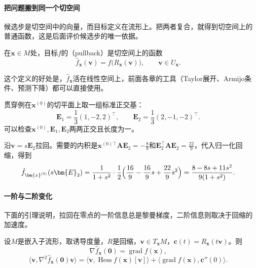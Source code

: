 \paragraph{把问题搬到同一个切空间}
候选步是切空间中的向量，而目标定义在流形上。把两者复合，就得到切空间上的普通函数，这是后面评价候选步的唯一依据。

\begin{definition}[拉回目标]
 \label{def:mfo-pullback}
 在$\bm{x}\in M$处，目标$f$的（pullback）是切空间上的函数
 \begin{equation}
  \hat{f}_{\bm{x}}(\bm{v})=f\bigl(R_{\bm{x}}(\bm{v})\bigr),\qquad\bm{v}\in U_{\bm{x}}.
  \label{eq:mfo-pullback}
 \end{equation}
\end{definition}

这个定义的好处是，$\hat{f}_{\bm{x}}$活在线性空间上，前面各章的工具（Taylor展开、Armijo条件、预测下降）都可以直接使用。

贯穿例在$\bm{x}^{(0)}$的切平面上取一组标准正交基：
\[
 \bm{E}_1=\frac13(1,-2,2)^\top,\qquad
 \bm{E}_2=\frac13(2,-1,-2)^\top.
\]
可以检查$\bm{x}^{(0)},\bm{E}_1,\bm{E}_2$两两正交且长度为一。

沿$\bm{v}=s\bm{E}_2$拉回。需要的内积是$\bm{x}^{(0)\top}\bm{A}\bm{E}_2=-\tfrac89$和$\bm{E}_2^\top\bm{A}\bm{E}_2=\tfrac{22}{9}$，代入归一化回缩，得到
\begin{equation}
 \hat{f}_{\bm{x}^{(0)}}(s\bm{E}_2)=\frac{1}{1+s^2}\cdot\frac12\Bigl(\frac{16}{9}-\frac{16}{9}s+\frac{22}{9}s^2\Bigr)=\frac{8-8s+11s^2}{9(1+s^2)}.
 \label{eq:mfo-pullback-line}
\end{equation}

\paragraph{一阶与二阶变化}
下面的引理说明，拉回在零点的一阶信息总是黎曼梯度，二阶信息则取决于回缩的加速度。

\begin{lemma}[拉回的导数]
 \label{lem:mfo-pullback-derivatives}
 设$M$是嵌入子流形，取诱导度量，$R$是回缩，$\bm{v}\in T_{\bm{x}}M$，$\bm{c}(t)=R_{\bm{x}}(t\bm{v})$。则
 \begin{equation}
  \nabla\hat{f}_{\bm{x}}(\bm{0})=\operatorname{grad}f(\bm{x}),
  \label{eq:mfo-pullback-grad}
 \end{equation}
 \begin{equation}
  \langle\bm{v},\nabla^2\hat{f}_{\bm{x}}(\bm{0})\bm{v}\rangle=\langle\bm{v},\operatorname{Hess}f(\bm{x})[\bm{v}]\rangle+\bigl\langle\operatorname{grad}f(\bm{x}),\bm{c}''(0)\bigr\rangle.
  \label{eq:mfo-pullback-hess}
 \end{equation}
\end{lemma}


